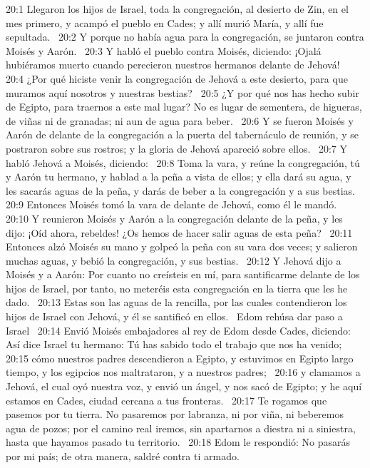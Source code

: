 20:1 Llegaron los hijos de Israel, toda la congregación, al desierto de Zin, en el mes primero, y acampó el pueblo en Cades; y allí murió María, y allí fue sepultada.  
20:2 Y porque no había agua para la congregación, se juntaron contra Moisés y Aarón.  
20:3 Y habló el pueblo contra Moisés, diciendo: ¡Ojalá hubiéramos muerto cuando perecieron nuestros hermanos delante de Jehová!  
20:4 ¿Por qué hiciste venir la congregación de Jehová a este desierto, para que muramos aquí nosotros y nuestras bestias?  
20:5 ¿Y por qué nos has hecho subir de Egipto, para traernos a este mal lugar? No es lugar de sementera, de higueras, de viñas ni de granadas; ni aun de agua para beber.  
20:6 Y se fueron Moisés y Aarón de delante de la congregación a la puerta del tabernáculo de reunión, y se postraron sobre sus rostros; y la gloria de Jehová apareció sobre ellos.  
20:7 Y habló Jehová a Moisés, diciendo:  
20:8 Toma la vara, y reúne la congregación, tú y Aarón tu hermano, y hablad a la peña a vista de ellos; y ella dará su agua, y les sacarás aguas de la peña, y darás de beber a la congregación y a sus bestias.  
20:9 Entonces Moisés tomó la vara de delante de Jehová, como él le mandó.  
20:10 Y reunieron Moisés y Aarón a la congregación delante de la peña, y les dijo: ¡Oíd ahora, rebeldes! ¿Os hemos de hacer salir aguas de esta peña?  
20:11 Entonces alzó Moisés su mano y golpeó la peña con su vara dos veces; y salieron muchas aguas, y bebió la congregación, y sus bestias.  
20:12 Y Jehová dijo a Moisés y a Aarón: Por cuanto no creísteis en mí, para santificarme delante de los hijos de Israel, por tanto, no meteréis esta congregación en la tierra que les he dado.  
20:13 Estas son las aguas de la rencilla, por las cuales contendieron los hijos de Israel con Jehová, y él se santificó en ellos.  
Edom rehúsa dar paso a Israel  
20:14 Envió Moisés embajadores al rey de Edom desde Cades, diciendo: Así dice Israel tu hermano: Tú has sabido todo el trabajo que nos ha venido;  
20:15 cómo nuestros padres descendieron a Egipto, y estuvimos en Egipto largo tiempo, y los egipcios nos maltrataron, y a nuestros padres;  
20:16 y clamamos a Jehová, el cual oyó nuestra voz, y envió un ángel, y nos sacó de Egipto; y he aquí estamos en Cades, ciudad cercana a tus fronteras.  
20:17 Te rogamos que pasemos por tu tierra. No pasaremos por labranza, ni por viña, ni beberemos agua de pozos; por el camino real iremos, sin apartarnos a diestra ni a siniestra, hasta que hayamos pasado tu territorio.  
20:18 Edom le respondió: No pasarás por mi país; de otra manera, saldré contra ti armado.  
